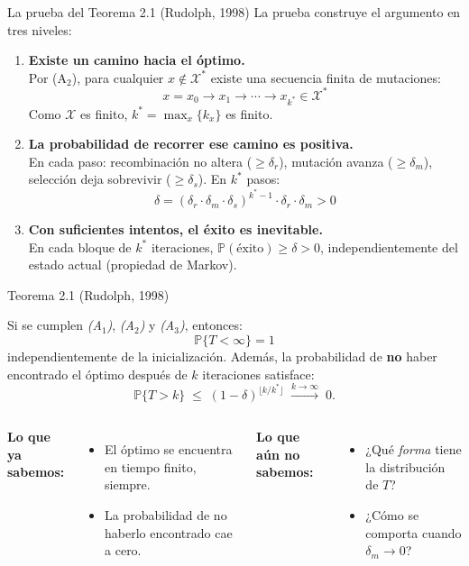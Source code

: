 \documentclass[aspectratio=169]{beamer}
\newcommand{\Prob}{\mathbb{P}}
\begin{document}
\begin{frame}{La prueba del Teorema 2.1 (Rudolph, 1998)}
  La prueba construye el argumento en tres niveles:

  \medskip
  \begin{enumerate}
    \item<1-> \textbf{Existe un camino hacia el óptimo.}\\
          Por (A$_2$), para cualquier $x \notin \mathcal{X}^*$ existe
          una secuencia finita de mutaciones:
          \[x = x_0 \to x_1 \to \cdots \to x_{k^*} \in \mathcal{X}^*\]
          Como $\mathcal{X}$ es finito, $k^* = \max_x\{k_x\}$ es finito.

    \bigskip
    \item<2-> \textbf{La probabilidad de recorrer ese camino es positiva.}\\
          En cada paso: recombinación no altera ($\geq \delta_r$),
          mutación avanza ($\geq \delta_m$), selección deja sobrevivir
          ($\geq \delta_s$). En $k^*$ pasos:
          \[\delta = (\delta_r \cdot \delta_m \cdot \delta_s)^{k^*-1}
            \cdot \delta_r \cdot \delta_m > 0\]

    \bigskip
    \item<3-> \textbf{Con suficientes intentos, el éxito es inevitable.}\\
          En cada bloque de $k^*$ iteraciones, $\Prob(\text{éxito}) \geq \delta > 0$,
          independientemente del estado actual (propiedad de Markov).
  \end{enumerate}
\end{frame}

\begin{frame}{Teorema 2.1 (Rudolph, 1998)}
  \begin{theorem}[Rudolph, 1998]
    Si se cumplen \emph{(A$_1$)}, \emph{(A$_2$)} y \emph{(A$_3$)},
    entonces:
    \[
      \Prob\{T < \infty\} = 1
    \]
    independientemente de la inicialización. Además, la probabilidad
    de \textbf{no} haber encontrado el óptimo después de $k$
    iteraciones satisface:
    \[
      \Prob\{T > k\}
      \;\leq\;
      (1-\delta)^{\lfloor k/k^* \rfloor}
      \;\xrightarrow{k\to\infty}\; 0.
    \]
  \end{theorem}

  \bigskip
  \begin{columns}[T]
    \textbf{Lo que ya sabemos:}
    \begin{itemize}
      \item El óptimo se encuentra en tiempo finito, siempre.
      \item La probabilidad de no haberlo encontrado cae a cero.
    \end{itemize}

    \textbf{Lo que aún no sabemos:}
    \begin{itemize}
      \item ¿Qué \textit{forma} tiene la distribución de $T$?
      \item ¿Cómo se comporta cuando $\delta_m \to 0$?
    \end{itemize}
  \end{columns}
\end{frame}
\end{document}
